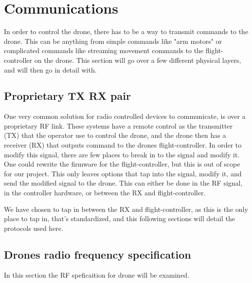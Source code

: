 \section{Communications}\label{s:coms}
In order to control the drone, there has to be a way to transmit commands to the drone. This can be anything from simple commands like "arm motors" or complicated commands like streaming movement commands to the flight-controller on the drone.
This section will go over a few different physical layers, and will then go in detail with.

\subsection*{Proprietary TX RX pair}\label{ss:rc-txrx}
One very common solution for radio controlled devices to communicate, is over a proprietary RF link. These systems have a remote control as the transmitter (TX) that the operator use to control the drone, and the drone then has a receiver (RX) that outputs command to the drones flight-controller.
\newline
In order to modify this signal, there are few places to break in to the signal and modify it. One could rewrite the firmware for the flight-controller, but this is out of scope for our project. This only leaves options that tap into the signal, modify it, and send the modified signal to the drone.
This can either be done in the RF signal, in the controller hardware, or between the RX and flight-controller. 

We have chosen to tap in between the RX and flight-controller, as this is the only place to tap in, that's standardized, and this following sections will detail the protocols used here.\\
\newline

\subsection*{Drones radio frequency specification}
In this section the RF speficaition for drone will be examined. 

